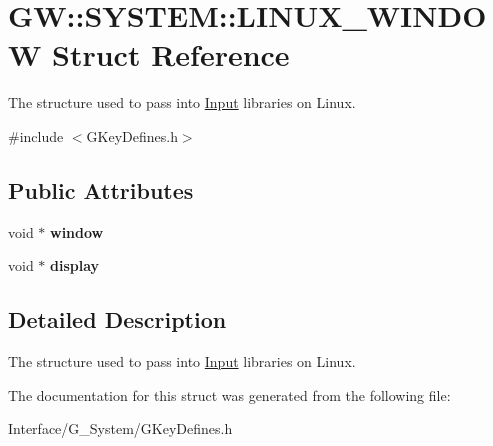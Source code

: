 \hypertarget{structGW_1_1SYSTEM_1_1LINUX__WINDOW}{}\section{GW\+:\+:S\+Y\+S\+T\+EM\+:\+:L\+I\+N\+U\+X\+\_\+\+W\+I\+N\+D\+OW Struct Reference}
\label{structGW_1_1SYSTEM_1_1LINUX__WINDOW}


The structure used to pass into \hyperlink{classInput}{Input} libraries on Linux.  




{\ttfamily \#include $<$G\+Key\+Defines.\+h$>$}

\subsection*{Public Attributes}
\begin{DoxyCompactItemize}
\item 
void $\ast$ {\bfseries window}\hypertarget{structGW_1_1SYSTEM_1_1LINUX__WINDOW_a9d4ffe1d048716af5f2d1fe3595b6b99}{}\label{structGW_1_1SYSTEM_1_1LINUX__WINDOW_a9d4ffe1d048716af5f2d1fe3595b6b99}

\item 
void $\ast$ {\bfseries display}\hypertarget{structGW_1_1SYSTEM_1_1LINUX__WINDOW_ae68b93065e8ebd9de010f42ccf688ac5}{}\label{structGW_1_1SYSTEM_1_1LINUX__WINDOW_ae68b93065e8ebd9de010f42ccf688ac5}

\end{DoxyCompactItemize}


\subsection{Detailed Description}
The structure used to pass into \hyperlink{classInput}{Input} libraries on Linux. 

The documentation for this struct was generated from the following file\+:\begin{DoxyCompactItemize}
\item 
Interface/\+G\+\_\+\+System/G\+Key\+Defines.\+h\end{DoxyCompactItemize}
